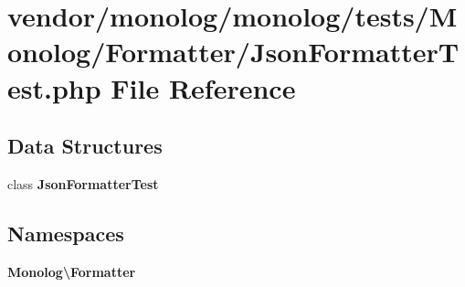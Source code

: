 \section{vendor/monolog/monolog/tests/\+Monolog/\+Formatter/\+Json\+Formatter\+Test.php File Reference}
\label{_json_formatter_test_8php}
\subsection*{Data Structures}
\begin{DoxyCompactItemize}
\item 
class {\bf Json\+Formatter\+Test}
\end{DoxyCompactItemize}
\subsection*{Namespaces}
\begin{DoxyCompactItemize}
\item 
 {\bf Monolog\textbackslash{}\+Formatter}
\end{DoxyCompactItemize}

